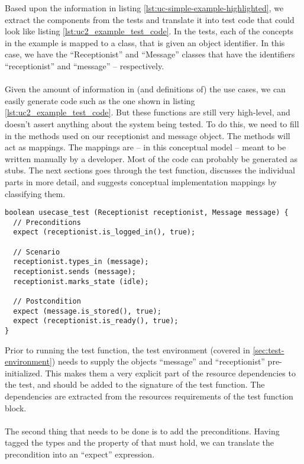 Based upon the information in listing \ref{lst:uc-simple-example-highlighted}, we extract the components from the tests and translate it into test code that could look like listing \ref{lst:uc2_example_test_code}. In the tests, each of the concepts in the example is mapped to a class, that is given an object identifier. In this case, we have the ``Receptionist'' and ``Message'' classes that have the identifiers ``receptionist'' and ``message'' -- respectively.\\\\
Given the amount of information in (and definitions of) the use cases, we can easily generate code such as the one shown in listing \ref{lst:uc2_example_test_code}. But these functions are still very high-level, and doesn't assert anything about the system being tested. To do this, we need to fill in the methods used on our receptionist and message object. The methods will act as mappings. The mappings are -- in this conceptual model -- meant to be written manually by a developer. Most of the code can probably be generated as stubs. The next sections goes through the test function, discusses the individual parts in more detail, and suggests conceptual implementation mappings by classifying them.
\begin{lstlisting}[style=Dart, caption=Suggested structure of generated test case,label={lst:uc2_example_test_code}]
boolean usecase_test (Receptionist receptionist, Message message) {
  // Preconditions
  expect (receptionist.is_logged_in(), true);

  // Scenario
  receptionist.types_in (message);
  receptionist.sends (message);
  receptionist.marks_state (idle);
  
  // Postcondition
  expect (message.is_stored(), true);
  expect (receptionist.is_ready(), true);
}
\end{lstlisting}
Prior to running the test function, the test environment (covered in \ref{sec:test-environment}) needs to supply the objects ``message'' and ``receptionist'' pre-initialized. This makes them a very explicit part of the resource dependencies to the test, and should be added to the signature of the test function. The dependencies are extracted from the resources requirements of the test function block.\\\\
The second thing that needs to be done is to add the preconditions. Having tagged the types and the property of that must hold, we can translate the precondition into an ``expect'' expression.\\\\
